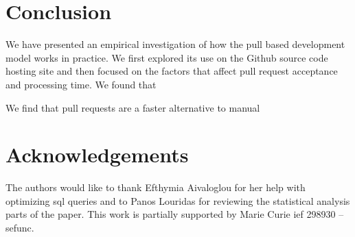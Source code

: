 \documentclass{acm_proc_article-sp}
\begin{document}
\section{Conclusion}

We have presented an empirical investigation of how the pull based development
model works in practice. We first explored its use on the Github source code
hosting site and then focused on the factors that affect pull request acceptance and processing time. We found that 

We find that pull requests are a faster alternative
to manual 

\section*{Acknowledgements}

The authors would like to thank Efthymia Aivaloglou for her help with 
optimizing {\sc sql} queries and to Panos Louridas for reviewing the 
statistical analysis parts of the paper.
This work is partially supported by Marie Curie {\sc ief} 298930 -- {\sc sefunc}.



\end{document}
